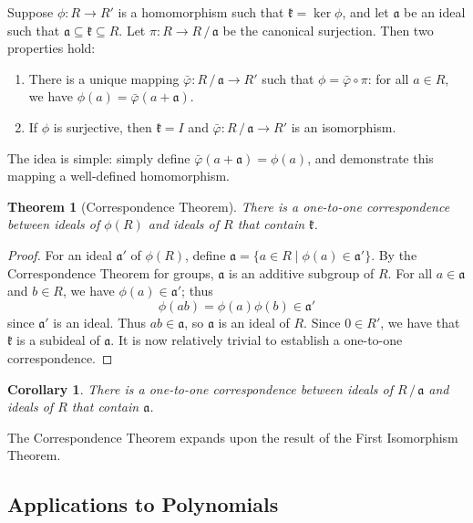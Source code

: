 \documentclass[11pt]{article}
\newtheorem{theorem}{Theorem}
\newtheorem{corollary}{Corollary}
\begin{document}
Suppose $\phi : R \to R'$ is a homomorphism such that $\mathfrak{k} = \ker \phi$, and let $\mathfrak{a}$ be an ideal such that $\mathfrak{a} \subseteq \mathfrak{k} \subseteq R$. Let $\pi : R \to R \,/\, \mathfrak{a}$ be the canonical surjection. Then two properties hold:
\begin{enumerate}
  \item There is a unique mapping $\bar{\varphi} : R \,/\, \mathfrak{a} \to R'$ such that $\phi = \bar{\varphi} \circ \pi$: for all $a \in R$, we have $\phi(a) = \bar{\varphi}(a + \mathfrak{a})$.
  \item If $\phi$ is surjective, then $\mathfrak{k} = I$ and $\bar{\varphi} : R \,/\, \mathfrak{a} \to R'$ is an isomorphism.
\end{enumerate}
The idea is simple: simply define $\bar{\varphi}(a + \mathfrak{a}) = \phi(a)$, and demonstrate this mapping a well-defined homomorphism.

\begin{adjustwidth}{0.5cm}{}
	\begin{theorem}[Correspondence Theorem]
		There is a one-to-one correspondence between ideals of $\phi(R)$ and ideals of $R$ that contain $\mathfrak{k}$.
	\end{theorem}
	\begin{proof}
		For an ideal $\mathfrak{a}'$ of $\phi(R)$, define $\mathfrak{a} = \{ a \in R \mid \phi(a) \in \mathfrak{a}' \}$. By the Correspondence Theorem for groups, $\mathfrak{a}$ is an additive subgroup of $R$. For all $a \in \mathfrak{a}$ and $b \in R$, we have $\phi(a) \in \mathfrak{a}'$; thus
		\[
			\phi(ab) = \phi(a) \phi(b) \in \mathfrak{a}'
		\]
		since $\mathfrak{a}'$ is an ideal. Thus $ab \in \mathfrak{a}$, so $\mathfrak{a}$ is an ideal of $R$. Since $0 \in R'$, we have that $\mathfrak{k}$ is a subideal of $\mathfrak{a}$. It is now relatively trivial to establish a one-to-one correspondence.
	\end{proof}
	\begin{corollary}
		There is a one-to-one correspondence between ideals of $R \,/\, \mathfrak{a}$ and ideals of $R$ that contain $\mathfrak{a}$.
	\end{corollary}
\end{adjustwidth}

The Correspondence Theorem expands upon the result of the First Isomorphism Theorem.


\subsection{Applications to Polynomials}
\end{document}

